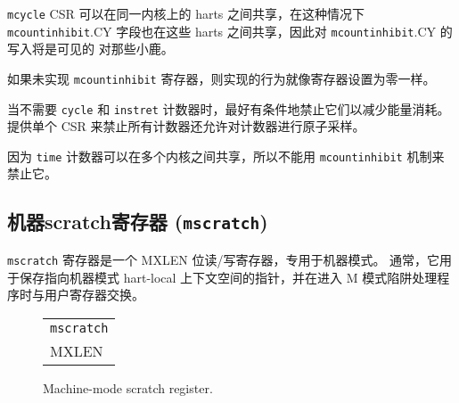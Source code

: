 {\tt mcycle} CSR 可以在同一内核上的 harts 之间共享，在这种情况下 {\tt mcountinhibit}.CY 字段也在这些 harts 之间共享，因此对 {\tt mcountinhibit}.CY 的写入将是可见的 对那些小鹿。

如果未实现 {\tt mcountinhibit} 寄存器，则实现的行为就像寄存器设置为零一样。

\iffalse
\begin{commentary}
When the {\tt cycle} and {\tt instret} counters are not needed, it is
desirable to conditionally inhibit them to reduce energy consumption.
Providing a single CSR to inhibit all counters also allows the counters to be
atomically sampled.

Because the {\tt time} counter can be shared between multiple cores, it
cannot be inhibited with the {\tt mcountinhibit} mechanism.
\end{commentary}
\fi

\begin{commentary}
当不需要 {\tt cycle} 和 {\tt instret} 计数器时，最好有条件地禁止它们以减少能量消耗。 提供单个 CSR 来禁止所有计数器还允许对计数器进行原子采样。

因为 {\tt time} 计数器可以在多个内核之间共享，所以不能用 {\tt mcountinhibit} 机制来禁止它。
\end{commentary}


\subsection{机器scratch寄存器 ({\tt mscratch})}

\iffalse
The {\tt mscratch} register is an MXLEN-bit read/write register
dedicated for use by machine mode.  Typically, it is used to hold a
pointer to a machine-mode hart-local context space and swapped with a
user register upon entry to an M-mode trap handler.
\fi
{\tt mscratch} 寄存器是一个 MXLEN 位读/写寄存器，专用于机器模式。 通常，它用于保存指向机器模式 hart-local 上下文空间的指针，并在进入 M 模式陷阱处理程序时与用户寄存器交换。

\begin{figure}[h!]
{\footnotesize
\begin{center}
\begin{tabular}{@{}J}
 \\
\hline
{} \\
\hline
MXLEN \\
\end{tabular}
\end{center}
}
\vspace{-0.1in}
\caption{Machine-mode scratch register.}
\label{mscratchreg}
\end{figure}


